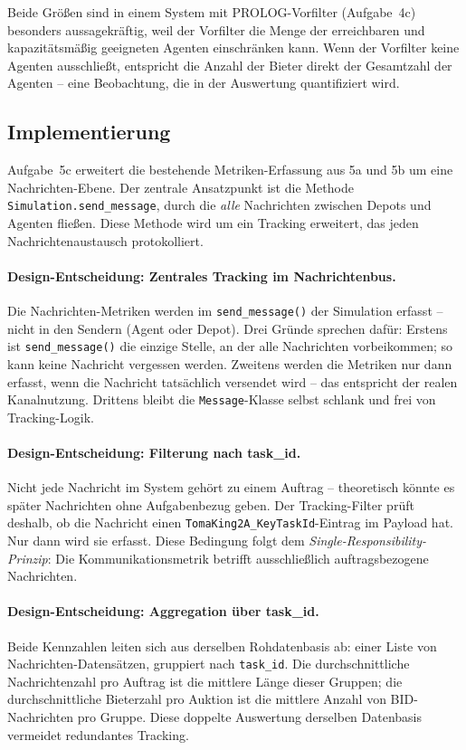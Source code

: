 Beide Größen sind in einem System mit \acs{PROLOG}-Vorfilter (Aufgabe~4c) besonders aussagekräftig, weil der Vorfilter die Menge der erreichbaren und kapazitätsmäßig geeigneten Agenten einschränken kann. Wenn der Vorfilter keine Agenten ausschließt, entspricht die Anzahl der Bieter direkt der Gesamtzahl der Agenten -- eine Beobachtung, die in der Auswertung quantifiziert wird.

\subsection{Implementierung}

Aufgabe~5c erweitert die bestehende Metriken-Erfassung aus 5a und 5b um eine Nachrichten-Ebene. Der zentrale Ansatzpunkt ist die Methode \texttt{Simulation.send\_message}, durch die \textit{alle} Nachrichten zwischen Depots und Agenten fließen. Diese Methode wird um ein Tracking erweitert, das jeden Nachrichtenaustausch protokolliert.

\paragraph{Design-Entscheidung: Zentrales Tracking im Nachrichtenbus.}
Die Nachrichten-Metriken werden im \texttt{send\_message()} der Simulation erfasst -- nicht in den Sendern (Agent oder Depot). Drei Gründe sprechen dafür: Erstens ist \texttt{send\_message()} die einzige Stelle, an der alle Nachrichten vorbeikommen; so kann keine Nachricht vergessen werden. Zweitens werden die Metriken nur dann erfasst, wenn die Nachricht tatsächlich versendet wird -- das entspricht der realen Kanalnutzung. Drittens bleibt die \texttt{Message}-Klasse selbst schlank und frei von Tracking-Logik.

\paragraph{Design-Entscheidung: Filterung nach task\_id.}
Nicht jede Nachricht im System gehört zu einem Auftrag -- theoretisch könnte es später Nachrichten ohne Aufgabenbezug geben. Der Tracking-Filter prüft deshalb, ob die Nachricht einen \texttt{TomaKing2A\_KeyTaskId}-Eintrag im Payload hat. Nur dann wird sie erfasst. Diese Bedingung folgt dem \textit{Single-Responsibility-Prinzip}: Die Kommunikationsmetrik betrifft ausschließlich auftragsbezogene Nachrichten.

\paragraph{Design-Entscheidung: Aggregation über task\_id.}
Beide Kennzahlen leiten sich aus derselben Rohdatenbasis ab: einer Liste von Nachrichten-Datensätzen, gruppiert nach \texttt{task\_id}. Die durchschnittliche Nachrichtenzahl pro Auftrag ist die mittlere Länge dieser Gruppen; die durchschnittliche Bieterzahl pro Auktion ist die mittlere Anzahl von BID-Nachrichten pro Gruppe. Diese doppelte Auswertung derselben Datenbasis vermeidet redundantes Tracking.

